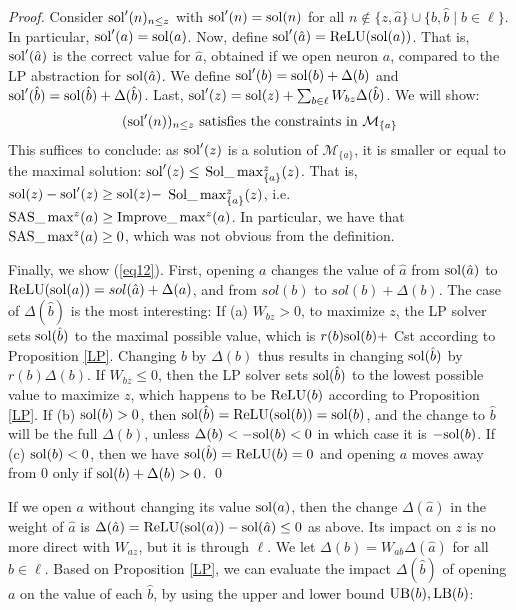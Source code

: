 	
	\begin{proof}
    Consider $\mathrm{sol}'(n)_{n \leq z}$ with
	$\mathrm{sol}'(n)=\mathrm{sol}(n)$ for all $n \notin \{z,\hat{a}\} \cup \{b,\hat{b} \mid b \in \ell\}$. In particular,  $\mathrm{sol}'(a) = \mathrm{sol}(a)$.
	Now, define $\mathrm{sol}'(\hat{a}) = \mathrm{ReLU}(\mathrm{sol}(a))$. 
	That is, $\mathrm{sol}'(\hat{a})$ is the correct value for $\hat{a}$, obtained if we open neuron $a$, compared to the LP abstraction for $\mathrm{sol}(\hat{a})$.
	We define $\mathrm{sol}'(b)=\mathrm{sol}(b)+\Delta(b)$ and 
	$\mathrm{sol}'(\hat{b})=\mathrm{sol}(\hat{b}) + \Delta(\hat{b})$.
	Last, $\mathrm{sol}'(z)=\mathrm{sol}(z) + \sum_{b \in \ell} W_{bz} \Delta(\hat{b})$.
	We will show:
	\begin{equation}
		\label{eq12}
		(\mathrm{sol}'(n))_{n \leq z} \text{ satisfies the constraints in } \mathcal{M}_{\{a\}}
	\end{equation} 
	This suffices to conclude: as
	$\mathrm{sol}'(z)$ is a solution of $\mathcal{M}_{\{a\}}$, it is smaller or equal to the maximal solution: $\mathrm{sol}'(z) \leq$ $\mathrm{Sol}\_\max_{\{a\}}^z(z)$. That is, 
	$\mathrm{sol}(z)-\mathrm{sol}'(z) \geq \mathrm{sol}(z) -$ $\mathrm{Sol}\_\max_{\{a\}}^z(z)$, i.e. 
	$ \mathrm{SAS}\_\max^z(a) \geq \mathrm{Improve}\_\max^z(a)$.
	In particular, we have that $\mathrm{SAS}\_\max^z(a) \geq 0$, which was not obvious from the definition.	

Finally, we show (\ref{eq12}). First, opening $a$ changes the value of $\hat{a}$ from
	$\mathrm{sol}(\hat{a})$ to $\mathrm{ReLU}(\mathrm{sol}(a)) = sol(\hat{a}) + \Delta(a)$, 
	and from $sol(b)$ to $sol(b) + \Delta(b)$.
	The case of $\Delta(\hat{b})$ is the most interesting:
	If (a) $W_{bz}>0$, to maximize $z$, the LP solver sets $\mathrm{sol}(\hat{b})$ to the maximal possible value, which is 
	$r(b) \mathrm{sol}(b)+$ Cst according to Proposition \ref{LP}.
Changing $b$ by $\Delta(b)$ thus results in changing $\mathrm{sol}(\hat{b})$ by 
$r(b) \Delta(b)$.
If $W_{bz}\leq0$, then the LP solver sets $\mathrm{sol}(\hat{b})$ to the lowest possible value to maximize $z$, which happens to be $\mathrm{ReLU}(b)$ according to Proposition \ref{LP}.
If (b) $\mathrm{sol}(b) > 0$, then 
$\mathrm{sol}(\hat{b})=\mathrm{ReLU}(\mathrm{sol}(b))=\mathrm{sol}(b)$, and the change to $\hat{b}$ will be 
the full $\Delta(b)$, unless $\Delta(b) < -\mathrm{sol}(b) < 0$ in which case it is 
$-\mathrm{sol}(b)$.
If (c) $\mathrm{sol}(b) < 0$, then we have $\mathrm{sol}(\hat{b})=\mathrm{ReLU}(b)=0$ and opening $a$ moves away 
from 0 only if $\mathrm{sol}(b)+\Delta(b)>0$. 
\qed
\end{proof}


\iffalse

	If we open $a$ without changing its value $\mathrm{sol}(a)$, then the change $\Delta(\hat{a})$ in the weight of $\hat{a}$ is 
$\Delta(\hat{a})=\mathrm{ReLU}(\mathrm{sol}(a)) - \mathrm{sol}(\hat{a}) \leq 0$ as above. Its impact on $z$ is no more direct with $W_{az}$, but it is through $\ell$. 
We let $\Delta(b) = W_{ab}\Delta(\hat{a})$ for all $b \in \ell$.
Based on Proposition \ref{LP}, we can evaluate the impact 
$\Delta(\hat{b})$ of opening $a$ on the value of each $\hat{b}$, by using the upper and lower bound $\mathrm{UB}(b),\mathrm{LB}(b)$:

